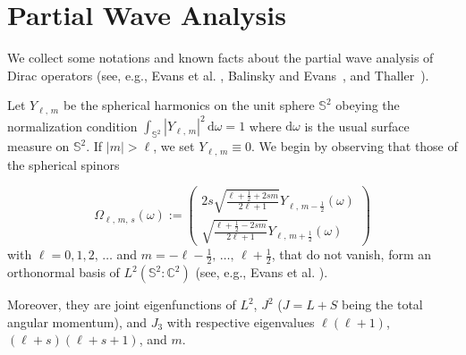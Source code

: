 \documentclass[AHL,Unicode,longabstracts,published]{cedram}
\newcommand*\rd{\mathrm{d}}
\newcommand{\bbS}{\mathbb{S}}
\newcommand*\cz{\mathbb{C}}
\newcommand*\domega{\rd\omega}
\begin{document}
\appendix

\section{Partial Wave Analysis}
\label{Anhang1}
\label{a:partialwaves}
We collect some notations and known facts about the partial wave analysis of Dirac operators (see, e.g., Evans et al. \cite{Evansetal1996}, Balinsky and Evans~\cite[Section~2.1]{BalinskyEvans2011}, and Thaller~\cite[Sections~4.6.3-4.6.5]{Thaller1992}).

Let $Y_{\ell,\,m}$ be the spherical harmonics on the unit sphere $\bbS^2$ obeying the normalization condition $\int_{\bbS^2}|Y_{\ell,\,m}|^2\,\domega=1$ where $\domega$ is the usual surface measure on $\bbS^2$. If $|m|>\ell$, we set $Y_{\ell,\,m}\equiv0$. We begin by observing that those of the spherical spinors

\begin{equation}\label{2.6}
\Omega_{\ell,\,m,\,s}(\omega) :=
\begin{pmatrix} 2s\sqrt{\frac{\ell+\frac12+2sm}{2\ell+1}}
Y_{\ell,\,m-\frac12}(\omega)\\ \sqrt{\frac{\ell+\frac12-2sm}{2\ell+1}} Y_{\ell,\,m+\frac12}(\omega)
\end{pmatrix}
\end{equation}
with $\ell=0,1,2,\,\dots$ and $m=-\ell-\frac12,\,\dots,\,\ell+\frac12$, that do not vanish, form an orthonormal basis of $L^2(\bbS^2:\cz^2)$ (see, e.g., Evans et al. \cite[Equation~(7)]{Evansetal1996}).

Moreover, they are joint eigenfunctions of $L^2$, $J^2$ ($J=L+S$ being the total angular momentum), and $J_3$ with respective eigenvalues $\ell(\ell+1)$, $(\ell+s)(\ell+s+1)$, and $m$.
\end{document}
